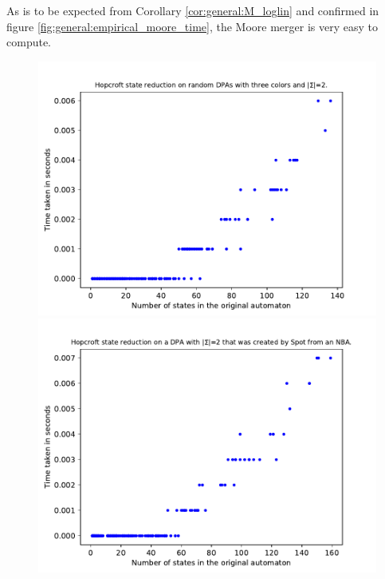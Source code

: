 As is to be expected from Corollary \ref{cor:general:M_loglin} and confirmed in figure \ref{fig:general:empirical_moore_time}, the Moore merger is very easy to compute.


\begin{figure}
	\centering
	\begin{minipage}{0.49\textwidth}
		\includegraphics[page=6,height=.3\textheight]{../data/analysis/hopcroft/gendet_ap1.pdf} 
		\includegraphics[page=6,height=.3\textheight]{../data/analysis/hopcroft/detspot_ap1.pdf} 

\end{minipage}
\end{figure}
